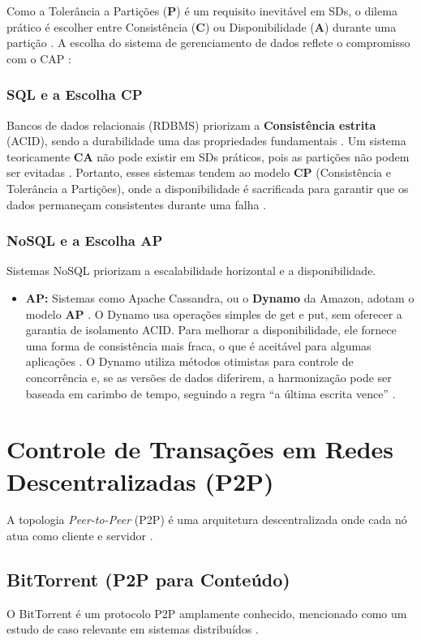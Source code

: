 \documentclass[a4paper,12pt]{article}
\begin{document}
Como a Tolerância a Partições (\textbf{P}) é um requisito inevitável em SDs, o dilema prático é escolher entre Consistência (\textbf{C}) ou Disponibilidade (\textbf{A}) durante uma partição \cite{61, 64}.
A escolha do sistema de gerenciamento de dados reflete o compromisso com o CAP \cite{61, 63}:

\subsubsection{SQL e a Escolha CP}
Bancos de dados relacionais (RDBMS) priorizam a \textbf{Consistência estrita} (ACID), sendo a durabilidade uma das propriedades fundamentais \cite{349}.
Um sistema teoricamente \textbf{CA} não pode existir em SDs práticos, pois as partições não podem ser evitadas \cite{64}.
Portanto, esses sistemas tendem ao modelo \textbf{CP} (Consistência e Tolerância a Partições), onde a disponibilidade é sacrificada para garantir que os dados permaneçam consistentes durante uma falha \cite{67}.

\subsubsection{NoSQL e a Escolha AP}
Sistemas NoSQL priorizam a escalabilidade horizontal e a disponibilidade.

\begin{itemize}
    \item \textbf{AP:} Sistemas como Apache Cassandra, ou o \textbf{Dynamo} da Amazon, adotam o modelo \textbf{AP} \cite{67}.
    O Dynamo usa operações simples de get e put, sem oferecer a garantia de isolamento ACID.
    Para melhorar a disponibilidade, ele fornece uma forma de consistência mais fraca, o que é aceitável para algumas aplicações \cite{399}.
    O Dynamo utiliza métodos otimistas para controle de concorrência e, se as versões de dados diferirem, a harmonização pode ser baseada em carimbo de tempo, seguindo a regra ``a última escrita vence'' \cite{400}.
\end{itemize}

\section{Controle de Transações em Redes Descentralizadas (P2P)}
A topologia \textit{Peer-to-Peer} (P2P) é uma arquitetura descentralizada onde cada nó atua como cliente e servidor \cite{2, 28, 4}.

\subsection{BitTorrent (P2P para Conteúdo)}
O BitTorrent é um protocolo P2P amplamente conhecido, mencionado como um estudo de caso relevante em sistemas distribuídos \cite{7}.
\end{document}
